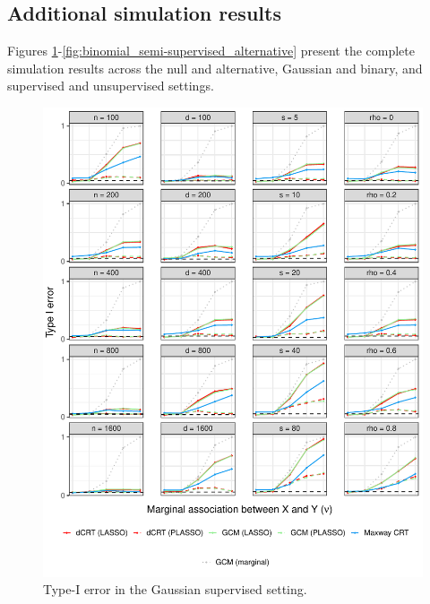 \documentclass[12pt]{article}
\theoremstyle{definition}
\theoremstyle{remark}
\begin{document}
\subsection{Additional simulation results} \label{sec:additional-simulation-results}

Figures \ref{fig:gaussian_supervised_null}-\ref{fig:binomial_semi-supervised_alternative} present the complete simulation results across the null and alternative, Gaussian and binary, and supervised and unsupervised settings.

\begin{figure}[!ht]
	\centering
	\includegraphics[scale = 1]{figures/gaussian_supervised_setting_null.pdf}
	\caption{Type-I error in the Gaussian supervised setting.}
	\label{fig:gaussian_supervised_null}
\end{figure}
\end{document}
